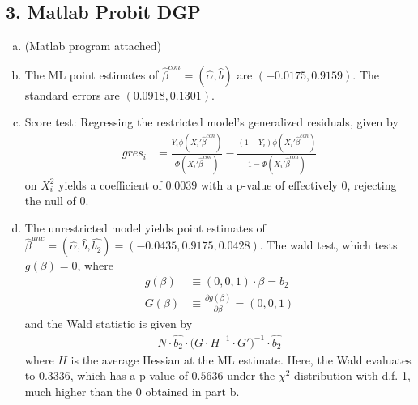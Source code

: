 \documentclass[11pt]{article}
\begin{document}
\begin{center}
\end{center}

\subsection*{3. Matlab Probit DGP}

\begin{enumerate}[a)]

	\item (Matlab program attached)

	\item The ML point estimates of $\hat{\beta}^{con} = (\hat{\alpha},\hat{b})$ are $(-0.0175,0.9159)$. The standard errors are $(0.0918,0.1301)$.

	\item Score test: Regressing the restricted model's generalized residuals, given by
	\begin{align*}
		gres_i &= \frac{Y_i \phi(X_i'\hat{\beta}^{con})}{\Phi(X_i'\hat{\beta}^{con})} - \frac{(1 - Y_i)\phi(X_i' \hat{\beta}^{con})}{1 - \Phi(X_i'\hat{\beta}^{con})}
	\end{align*}
	on $X_i^2$ yields a coefficient of $0.0039$ with a p-value of effectively 0, rejecting the null of 0.

	\item The unrestricted model yields point estimates of $\hat{\beta}^{unc} = (\hat{\alpha},\hat{b},\hat{b_2}) = (-0.0435, 0.9175, 0.0428)$. The wald test, which tests $g(\beta) = 0$, where
	\begin{align*}
		g(\beta) &\equiv (0, 0, 1) \cdot \beta = b_2 \\
		G(\beta) &\equiv \frac{\partial g(\beta)}{\partial \beta} = (0, 0, 1)
	\end{align*}
	and the Wald statistic is given by
	\begin{align*}
		N \cdot \hat{b_2} \cdot \bigg( G \cdot H^{-1} \cdot G' \bigg)^{-1} \cdot \hat{b_2}
	\end{align*}
	where $H$ is the average Hessian at the ML estimate. Here, the Wald evaluates to 0.3336, which has a p-value of $0.5636$ under the $\chi^2$ distribution with d.f. 1, much higher than the $0$ obtained in part b.

\end{enumerate}
\end{document}
